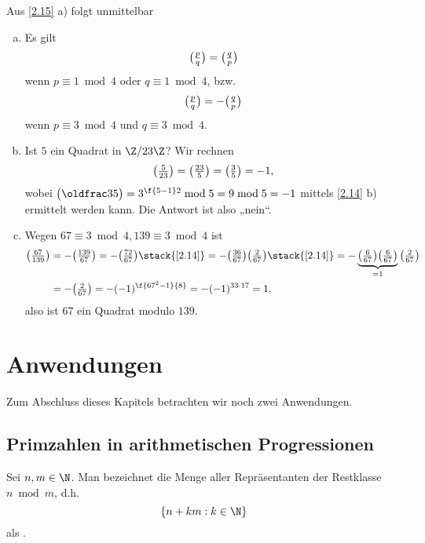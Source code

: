 \begin{ex} \label{2.16}
	Aus \ref{2.15} a) folgt unmittelbar
	\begin{enumerate}[a)]
		\item
			Es gilt
			\[
				\legsym pq = \legsym qp
			\]
			wenn $p \equiv 1 \bmod 4$ oder $q \equiv 1 \bmod 4$,
			bzw.
			\[
				\legsym pq = - \legsym qp
			\]
			wenn $p \equiv 3 \bmod 4$ und $q \equiv 3 \bmod 4$.
		\item
			Ist $5$ ein Quadrat in $\Z / 23\Z$?
			Wir rechnen
			\[
				\legsym 5{23}
				= \legsym {23}5
				= \legsym 35
				= -1,
			\]
			wobei $\legsym 35 = 3^{\f{5-1}2} \bmod 5 = 9 \bmod 5 = -1$ mittels \ref{2.14} b) ermittelt werden kann.
			Die Antwort ist also „nein“.
		\item
			Wegen $67 \equiv 3 \bmod 4, 139 \equiv 3 \bmod 4$ ist
			\begin{align*}
				\legsym{67}{139}
				&= - \legsym{139}{67}
				= - \legsym{72}{67}
				\stack{\ref{2.14}}= - \legsym{36}{67} \legsym{2}{67}
				\stack{\ref{2.14}}= - \underbrace{\legsym{6}{67} \legsym{6}{67}}_{=1} \legsym{2}{67} \\
				&= - \legsym{2}{67}
				= - (-1)^{\f{67^2-1}{8}}
				= - (-1)^{33\cdot 17}
				= 1,
			\end{align*}
			also ist $67$ ein Quadrat modulo $139$.
	\end{enumerate}
\end{ex}


\section{Anwendungen}


Zum Abschluss dieses Kapitels betrachten wir noch zwei Anwendungen.

\subsection{Primzahlen in arithmetischen Progressionen}

\begin{df*}
	Sei $n, m \in \N$.
	Man bezeichnet die Menge aller Repräsentanten der Restklasse $n \bmod m$, d.h.
	\[
		\{ n + km : k \in \N \}
	\]
	als .
\end{df*}


